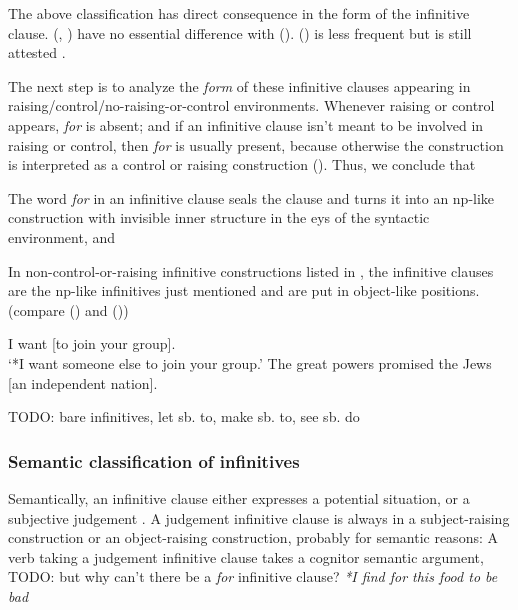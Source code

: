 \documentclass[UTF8, a4paper, oneside, scheme=plain, 12pt]{ctexbook}
\newcommand*{\citepage}[1]{p.~{#1}}
\newcommand{\form}[1]{\emph{#1}}
\newcommand{\translate}[1]{`#1'}
\begin{document}
The above classification has direct consequence in the form of the infinitive clause.
(,
)
have no essential difference with ().
() is less frequent 
but is still attested \citep[\citepage{243}]{dixon2005semantic}.

The next step is to analyze the \emph{form} of these infinitive clauses
appearing in raising/control/no-raising-or-control environments.
Whenever raising or control appears, \form{for} is absent;
and if an infinitive clause isn't meant to be involved in raising or control,
then \form{for} is usually present,
because otherwise the construction 
is interpreted as a control or raising construction 
().
Thus, we conclude that \begin{enumerate*}
    \item The word \form{for} in an infinitive clause seals the clause 
    and turns it into an \acs{np}-like construction 
    with invisible inner structure in the eys of the syntactic environment, and 
    \item In non-control-or-raising infinitive constructions listed 
    in ,
    the infinitive clauses are the \acs{np}-like infinitives just mentioned  
    and are put in object-like positions.
    (compare () and 
    ())
\end{enumerate*}

\begin{exe}
    \ex\label{ex:complement.infinitive.preference-control-reading} I want [to join your group]. \\
    \translate{*I want someone else to join your group.}
    \ex\label{ex:complement.infinitive.promise-np-object} The great powers promised the Jews [an independent nation].
\end{exe}

TODO: bare infinitives, let sb. to, make sb. to, see sb. do \citet[\citepage{1236},\citepage{1254}]{cgel}

\subsubsection{Semantic classification of infinitives}

Semantically, an infinitive clause either expresses a potential situation,
or a subjective judgement \citep[\citepage{245}]{dixon2005semantic}.
A judgement infinitive clause 
is always in a subject-raising construction or an object-raising construction,
probably for semantic reasons:
A verb taking a judgement infinitive clause 
takes a cognitor semantic argument,
TODO: but why can't there be a \form{for} infinitive clause? 
\form{*I find for this food to be bad}
\end{document}
